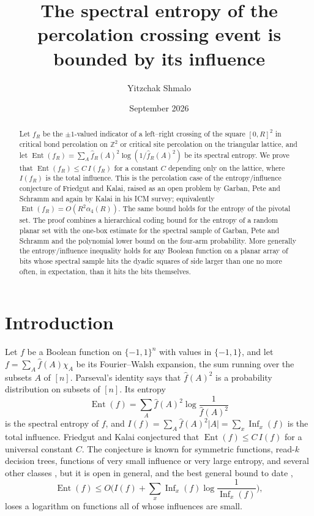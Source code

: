 \documentclass[11pt]{amsart}
\title[Spectral entropy of the percolation crossing event]{The spectral entropy of the percolation crossing event is bounded by its influence}
\author{Yitzchak Shmalo}
\date{September 2026}
\theoremstyle{remark}
\newcommand{\Ent}{\operatorname{Ent}}
\newcommand{\Inf}{\operatorname{Inf}}
\newcommand{\ZZ}{\mathbb{Z}}
\begin{document}
\begin{abstract}
Let $f_R$ be the $\pm1$-valued indicator of a left--right crossing of the square $[0,R]^2$ in critical bond percolation on $\ZZ^2$ or critical site percolation on the triangular lattice, and let $\Ent(f_R)=\sum_A \hat f_R(A)^2\log(1/\hat f_R(A)^2)$ be its spectral entropy. We prove that $\Ent(f_R)\le C\,I(f_R)$ for a constant $C$ depending only on the lattice, where $I(f_R)$ is the total influence. This is the percolation case of the entropy/influence conjecture of Friedgut and Kalai, raised as an open problem by Garban, Pete and Schramm and again by Kalai in his ICM survey; equivalently $\Ent(f_R)=O(R^2\alpha_4(R))$. The same bound holds for the entropy of the pivotal set. The proof combines a hierarchical coding bound for the entropy of a random planar set with the one-box estimate for the spectral sample of Garban, Pete and Schramm and the polynomial lower bound on the four-arm probability. More generally the entropy/influence inequality holds for any Boolean function on a planar array of bits whose spectral sample hits the dyadic squares of side larger than one no more often, in expectation, than it hits the bits themselves.
\end{abstract}

\maketitle

\section{Introduction}

Let $f$ be a Boolean function on $\{-1,1\}^n$ with values in $\{-1,1\}$, and let $f=\sum_{A}\hat f(A)\chi_A$ be its Fourier--Walsh expansion, the sum running over the subsets $A$ of $[n]$. Parseval's identity says that $\hat f(A)^2$ is a probability distribution on subsets of $[n]$. Its entropy
\[
\Ent(f)=\sum_{A}\hat f(A)^2\log\frac{1}{\hat f(A)^2}
\]
is the spectral entropy of $f$, and $I(f)=\sum_A\hat f(A)^2|A|=\sum_{x}\Inf_x(f)$ is the total influence. Friedgut and Kalai \cite{FK96} conjectured that $\Ent(f)\le C\,I(f)$ for a universal constant $C$. The conjecture is known for symmetric functions, read-$k$ decision trees, functions of very small influence or very large entropy, and several other classes \cite{OWZ11,KMS12,Sha18}, but it is open in general, and the best general bound to date \cite{Combinatorica24},
\[
\Ent(f)\le O\Big(I(f)+\sum_x\Inf_x(f)\log\frac{1}{\Inf_x(f)}\Big),
\]
loses a logarithm on functions all of whose influences are small.
\end{document}
